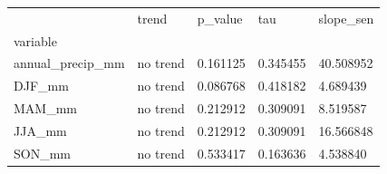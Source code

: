 \begin{tabular}{lllll}
\toprule
 & trend & p\_value & tau & slope\_sen \\
variable &  &  &  &  \\
\midrule
annual\_precip\_mm & no trend & 0.161125 & 0.345455 & 40.508952 \\
DJF\_mm & no trend & 0.086768 & 0.418182 & 4.689439 \\
MAM\_mm & no trend & 0.212912 & 0.309091 & 8.519587 \\
JJA\_mm & no trend & 0.212912 & 0.309091 & 16.566848 \\
SON\_mm & no trend & 0.533417 & 0.163636 & 4.538840 \\
\bottomrule
\end{tabular}
